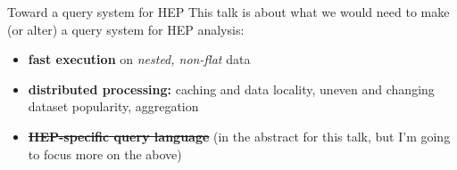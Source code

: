 \documentclass{beamer}
\begin{document}








\begin{frame}{Toward a query system for HEP}
\vspace{0.5 cm}
\large This talk is about what we would need to make (or alter) a query system for HEP analysis:

\vspace{0.3 cm}
\begin{itemize}\setlength{\itemsep}{0.3 cm}
\item {\bf fast execution} on {\it nested, non-flat} data
\item {\bf distributed processing:} caching and data locality, uneven and changing dataset popularity, aggregation
\item \sout{{\bf HEP-specific query language}} (in the abstract for this talk, but I'm going to focus more on the above)
\end{itemize}
\end{frame}
\end{document}

